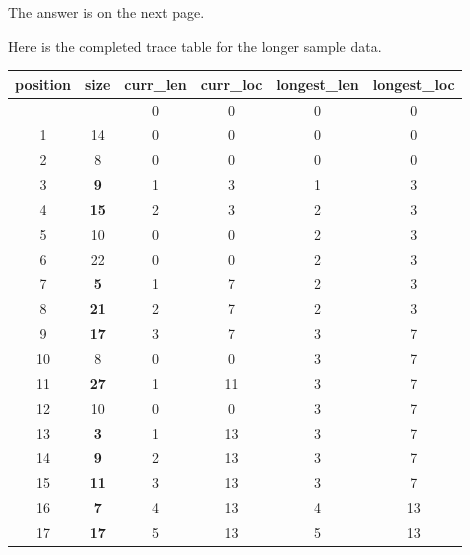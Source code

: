 The answer is on the next page.


\clearpage %

Here is the completed trace table for the longer sample data.

\bigskip
\begin{center}
  \begin{tabular}{S[table-format=2.0]S[table-format=2.0]S[table-format=2.0]
    S[table-format=2.0]S[table-format=2.0]S[table-format=2.0]}
    \toprule
    {position} & {size}       & {curr\_len} & {curr\_loc} & {longest\_len} & {longest\_loc} \\
    \midrule
               &              & 0           & 0           & 0              & 0              \\
    1          & 14           & 0           & 0           & 0              & 0              \\
    2          & 8            & 0           & 0           & 0              & 0              \\
    3          & \bfseries 9  & 1           & 3           & 1              & 3              \\
    4          & \bfseries 15 & 2           & 3           & 2              & 3              \\
    5          & 10           & 0           & 0           & 2              & 3              \\
    6          & 22           & 0           & 0           & 2              & 3              \\
    7          & \bfseries 5  & 1           & 7           & 2              & 3              \\
    8          & \bfseries 21 & 2           & 7           & 2              & 3              \\
    9          & \bfseries 17 & 3           & 7           & 3              & 7              \\
    10         & 8            & 0           & 0           & 3              & 7              \\
    11         & \bfseries 27 & 1           & 11          & 3              & 7              \\
    12         & 10           & 0           & 0           & 3              & 7              \\
    13         & \bfseries 3  & 1           & 13          & 3              & 7              \\
    14         & \bfseries 9  & 2           & 13          & 3              & 7              \\
    15         & \bfseries 11 & 3           & 13          & 3              & 7              \\
    16         & \bfseries 7  & 4           & 13          & 4              & 13             \\
    17         & \bfseries 17 & 5           & 13          & 5              & 13             \\
    \bottomrule
  \end{tabular}
\end{center}
